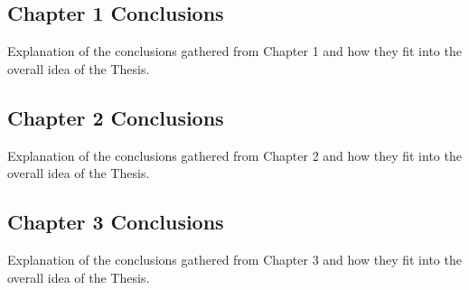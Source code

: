 \subsection{Chapter 1 Conclusions}

Explanation of the conclusions gathered from Chapter 1 and how they fit into the overall idea of the Thesis.

\subsection{Chapter 2 Conclusions}

Explanation of the conclusions gathered from Chapter 2 and how they fit into the overall idea of the Thesis.

\subsection{Chapter 3 Conclusions}

Explanation of the conclusions gathered from Chapter 3 and how they fit into the overall idea of the Thesis.
